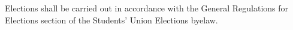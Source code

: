 \begin{clause}
Elections shall be carried out in accordance with the General Regulations for Elections section of the Students' Union Elections byelaw.
\end{clause}